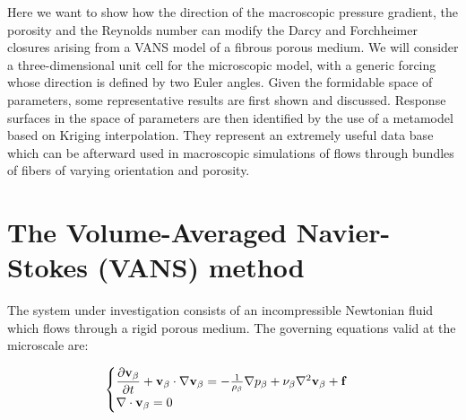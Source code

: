 Here we want to show how the direction of the macroscopic pressure gradient, the porosity and the Reynolds number can 
modify the Darcy and Forchheimer closures arising from a VANS model of a fibrous porous medium. We will consider a three-dimensional 
unit cell for the microscopic model, with a generic forcing 
whose direction is defined by two Euler angles. Given the formidable space of parameters, some representative results are first
shown and discussed. Response surfaces in the space of parameters are then identified by the use of a metamodel based on Kriging 
interpolation.
They represent an extremely useful data base which can be afterward used in macroscopic simulations of 
flows through bundles of fibers of varying orientation and porosity.





\section{The Volume-Averaged Navier-Stokes (VANS) method}

\label{sec:2ch4}

%
%
%
%
The system under investigation consists of an incompressible Newtonian fluid which flows through a rigid porous medium. The governing equations valid at the microscale are:

\begin{eqnarray*}
	\begin{cases}
\dfrac{\partial \textbf{v}_{\beta}}{\partial t} + \textbf{v}_{\beta} \cdot \nabla \textbf{v}_{\beta} = -\frac{1}{\rho_{\beta}} \nabla p_{\beta} + \nu_{\beta} \nabla^2  \textbf{v}_{\beta}  + \mathbf{f} \\
\nabla \cdot \textbf{v}_{\beta} = 0 
	\end{cases}
\label{eq:ns_f}
\end{eqnarray*}

